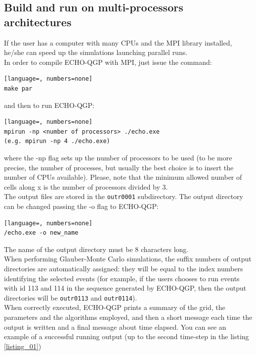 \subsection{Build and run on multi-processors architectures}
If the user has a computer with many CPUs and the MPI library installed, he/she can speed up the simulations launching parallel runs.\\
In order to compile ECHO-QGP with MPI, just issue the command:
\begin{lstlisting}[language=, numbers=none]
make par
\end{lstlisting}
and then to run ECHO-QGP:
\begin{lstlisting}[language=, numbers=none]
mpirun -np <number of processors> ./echo.exe
(e.g. mpirun -np 4 ./echo.exe)
\end{lstlisting}
where the -np flag sets up the number of processors to be used (to be more precise, the number of processes, but usually the best choice is to insert the number of CPUs available). Please, 
note that the minimum allowed number of cells along x is the number of processors divided by 3.\\
The output files are stored in the {\tt outr0001} subdirectory. The output directory can be changed passing the -o flag to ECHO-QGP:
\begin{lstlisting}[language=, numbers=none]
/echo.exe -o new_name
\end{lstlisting}
The name of the output directory must be 8 characters long.\\
When performing Glauber-Monte Carlo simulations, the suffix numbers of output directories are automatically assigned: they will be equal to the index numbers identifying the selected events (for example, if the users chooses to run events with id 113 and 114 in the sequence generated by ECHO-QGP, then the output directories will be {\tt outr0113} and {\tt outr0114}).\\


When correctly executed, ECHO-QGP prints a summary of the grid, the parameters and the algorithms employed, and then  a short message each time the output is written and a final message about time elapsed. You can see an example of a successful running output (up to the second time-step in the listing \ref{listing_01}) \\


